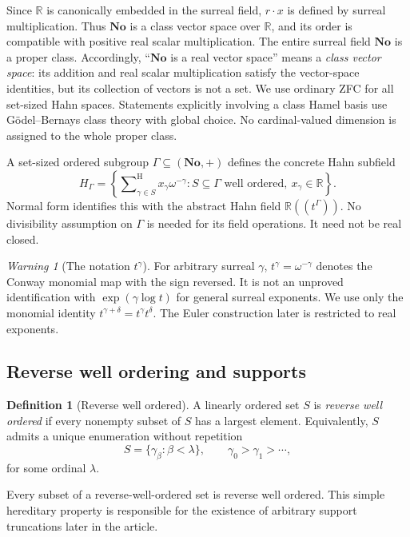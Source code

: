 \documentclass[11pt,letterpaper]{article}
\numberwithin{equation}{section}
\theoremstyle{definition}
\newtheorem{definition}[theorem]{Definition}
\theoremstyle{remark}
\newtheorem{warning}[theorem]{Warning}
\newcommand{\No}{\mathbf{No}}
\newcommand{\R}{\mathbb{R}}
\newcommand{\hSum}{\mathop{\sum}\nolimits^{\mathrm H}}
\begin{document}
Since $\R$ is canonically embedded in the surreal field, $r\cdot x$ is defined by
surreal multiplication. Thus $\No$ is a class vector space over $\R$, and its
order is compatible with positive real scalar multiplication.
The entire surreal field $\No$ is a proper class. Accordingly, ``$\No$ is a real vector space'' means a \emph{class vector space}: its addition and real scalar multiplication satisfy the vector-space identities, but its collection of vectors is not a set. We use ordinary ZFC for all set-sized Hahn spaces. Statements explicitly involving a class Hamel basis use G\"odel--Bernays class theory with global choice. No cardinal-valued dimension is assigned to the whole proper class.

A set-sized ordered subgroup $\Gamma\subseteq(\No,+)$ defines the concrete Hahn subfield
\begin{equation}\label{rvs:eu:eq:hahnrealization}
 H_\Gamma=\left\{\hSum_{\gamma\in S}x_\gamma\omega^{-\gamma}:
 S\subseteq\Gamma\text{ well ordered},\ x_\gamma\in\R\right\}.
\end{equation}
Normal form identifies this with the abstract Hahn field $\R((t^\Gamma))$. No divisibility assumption on $\Gamma$ is needed for its field operations. It need not be real closed.

\begin{warning}[The notation $t^\gamma$]
For arbitrary surreal $\gamma$, $t^\gamma=\omega^{-\gamma}$ denotes the Conway monomial map with the sign reversed. It is not an unproved identification with $\exp(\gamma\log t)$ for general surreal exponents. We use only the monomial identity $t^{\gamma+\delta}=t^\gamma t^\delta$. The Euler construction later is restricted to real exponents.
\end{warning}
\subsection{Reverse well ordering and supports}

\begin{definition}[Reverse well ordered]
A linearly ordered set \(S\) is \emph{reverse well ordered} if every nonempty
subset of \(S\) has a largest element.  Equivalently, \(S\) admits a unique
enumeration without repetition
\[
  S=\{\gamma_\beta:\beta<\lambda\},\qquad
  \gamma_0>\gamma_1>\cdots,
\]
for some ordinal \(\lambda\).
\end{definition}

Every subset of a reverse-well-ordered set is reverse well ordered.  This
simple hereditary property is responsible for the existence of arbitrary
support truncations later in the article.
\end{document}
